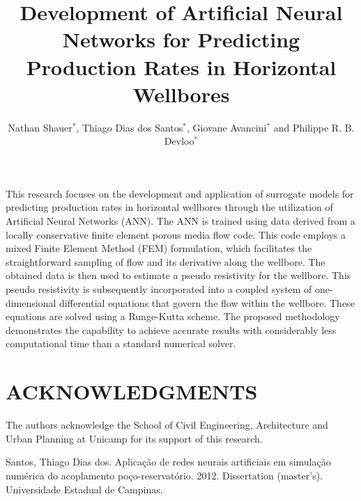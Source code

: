 \documentclass{cfc2025}
\title{Development of Artificial Neural Networks for Predicting Production Rates in Horizontal Wellbores}
\author{Nathan Shauer$^{*}$, Thiago Dias dos Santos$^{*}$, Giovane Avancini$^{*}$ and Philippe R. B. Devloo$^{*}$}
\begin{document}
\thispagestyle{empty}

This research focuses on the development and application of surrogate models for predicting production rates in horizontal wellbores through the utilization of Artificial Neural Networks (ANN). The ANN is trained using data derived from a locally conservative finite element porous media flow code. This code employs a mixed Finite Element Method (FEM) formulation, which facilitates the straightforward sampling of flow and its derivative along the wellbore. The obtained data is then used to estimate a pseudo resistivity for the wellbore. This pseudo resistivity is subsequently incorporated into a coupled system of one-dimensional differential equations that govern the flow within the wellbore. These equations are solved using a Runge-Kutta scheme. The proposed methodology demonstrates the capability to achieve accurate results with considerably less computational time than a standard numerical solver.

\section*{ACKNOWLEDGMENTS}

The authors acknowledge the School of Civil Engineering, Architecture and Urban Planning at Unicamp for its support of this research.

\begin{thebibliography}{99}
\fontsize{11}{12}\selectfont

 Santos, Thiago Dias dos. Aplicação de redes neurais artificiais em simulação numérica do acoplamento poço-reservatório. 2012. Dissertation (master's). Universidade Estadual de Campinas. 
\end{thebibliography}
\end{document}
